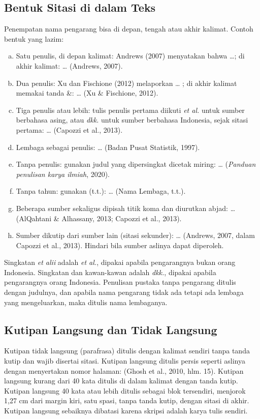 \subsection{Bentuk Sitasi di dalam Teks}
Penempatan nama pengarang bisa di depan, tengah atau akhir kalimat. Contoh bentuk yang lazim:
\begin{enumerate}[a.]
\item Satu penulis, di depan kalimat: Andrews (2007) menyatakan bahwa …; di akhir kalimat: … (Andrews, 2007).
\item Dua penulis: Xu dan Fischione (2012) melaporkan … ; di akhir kalimat memakai tanda \&: … (Xu \& Fischione, 2012).
\item Tiga penulis atau lebih: tulis penulis pertama diikuti \textit{et al.} untuk sumber berbahasa asing, atau \textit{dkk.} untuk sumber berbahasa Indonesia, sejak sitasi pertama: … (Capozzi et al., 2013).
\item Lembaga sebagai penulis: … (Badan Pusat Statistik, 1997).
\item Tanpa penulis: gunakan judul yang dipersingkat dicetak miring: … (\textit{Panduan penulisan karya ilmiah}, 2020).
\item Tanpa tahun: gunakan (t.t.): … (Nama Lembaga, t.t.).
\item Beberapa sumber sekaligus dipisah titik koma dan diurutkan abjad: … (AlQahtani \& Alhassany, 2013; Capozzi et al., 2013).
\item Sumber dikutip dari sumber lain (sitasi sekunder): … (Andrews, 2007, dalam Capozzi et al., 2013). Hindari bila sumber aslinya dapat diperoleh.
\end{enumerate}
Singkatan \textit{et alii} adalah \textit{et al.}, dipakai apabila pengarangnya bukan orang Indonesia. Singkatan dan kawan-kawan adalah \textit{dkk.}, dipakai apabila pengarangnya orang Indonesia. Penulisan pustaka tanpa pengarang ditulis dengan judulnya, dan apabila nama pengarang tidak ada tetapi ada lembaga yang mengeluarkan, maka ditulis nama lembaganya.

\subsection{Kutipan Langsung dan Tidak Langsung}
Kutipan tidak langsung (parafrasa) ditulis dengan kalimat sendiri tanpa tanda kutip dan wajib disertai sitasi. Kutipan langsung ditulis persis seperti aslinya dengan menyertakan nomor halaman: (Ghosh et al., 2010, hlm. 15). Kutipan langsung kurang dari 40 kata ditulis di dalam kalimat dengan tanda kutip. Kutipan langsung 40 kata atau lebih ditulis sebagai blok tersendiri, menjorok 1,27 cm dari margin kiri, satu spasi, tanpa tanda kutip, dengan sitasi di akhir. Kutipan langsung sebaiknya dibatasi karena skripsi adalah karya tulis sendiri.

